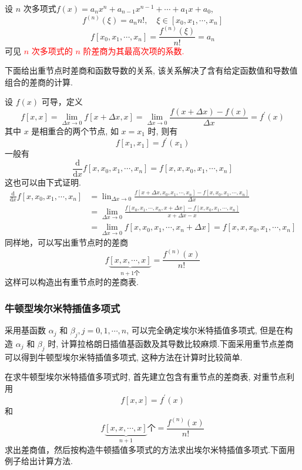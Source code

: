 设 $ n $ 次多项式$f(x)=a_{n} x^{n}+a_{n-1} x^{n-1}+\cdots+a_{1} x+a_{0}$,
$$
f^{(n)}(\xi)=a_{n} n!, \quad \xi \in\left[x_{0}, x_{1}, \cdots, x_{n}\right]$$
$$\boxed{f\left[x_{0}, x_{1}, \cdots, x_{n}\right]=\frac{f^{(n)}(\xi)}{n!}=a_{n}}
$$
可见 \textcolor{red}{$ n $ 次多项式的 $ n $ 阶差商为其最高次项的系数.}

下面给出重节点时差商和函数导数的关系, 该关系解决了含有给定函数值和导数值组合的差商的计算.

设 $ f(x) $ 可导，定义
$$
f[x, x]=\lim _{\Delta x \rightarrow 0} f[x+\Delta x, x]=\lim _{\Delta x \rightarrow 0} \frac{f(x+\Delta x)-f(x)}{\Delta x}=f^{\prime}(x) 
$$
其中 $ x $ 是相重合的两个节点, 如 $ x=x_{1} $ 时, 则有
$$
f\left[x_{1}, x_{1}\right]=f^{\prime}\left(x_{1}\right)
$$
一般有
$$
\frac{\mathrm{d}}{\mathrm{d} x} f\left[x, x_{0}, x_{1}, \cdots, x_{n}\right]=f\left[x, x, x_{0}, x_{1}, \cdots, x_{n}\right]
$$
这也可以由下式证明.
$$
\begin{aligned}
\frac{\mathrm{d}}{\mathrm{d} x} f\left[x, x_{0}, x_{1}, \cdots, x_{n}\right] & =\operatorname{lin}_{\Delta x \rightarrow 0} \frac{f\left[x+\Delta x, x_{0}, x_{1}, \cdots, x_{n}\right]-f\left[x, x_{0}, x_{1}, \cdots, x_{n}\right]}{\Delta x} \\
& =\lim _{\Delta x \rightarrow 0} \frac{f\left[x_{0}, x_{1}, \cdots, x_{n}, x+\Delta x\right]-f\left[x, x_{0}, x_{1}, \cdots, x_{n}\right]}{x+\Delta x-x} \\
& =\lim_{\Delta x \rightarrow 0} f\left[x, x_{0}, x_{1}, \cdots, x_{n}+\Delta x\right]=f\left[x, x, x_{0}, x_{1}, \cdots, x_{n}\right]
\end{aligned}
$$
同样地，可以写出重节点时的差商
$$
f \underbrace{[x, x, \cdots, x]}_{n+1 \text{个}}=\frac{f^{(n)}(x)}{n!}
$$
这样可以构造出有重节点时的差商表.

\subsubsection{牛顿型埃尔米特插值多项式}

采用基函数 $ \alpha_{j} $ 和 $ \beta_{j}, j=0,1, \cdots, n $, 可以完全确定埃尔米特插值多项式, 但是在构造 $ \alpha_{j} $ 和 $ \beta_{j} $ 时, 计算拉格朗日插值基函数及其导数比较麻烦.下面采用重节点差商可以得到牛顿型埃尔米特插值多项式, 这种方法在计算时比较简单.

在求牛顿型埃尔米特插值多项式时, 首先建立包含有重节点的差商表, 对重节点利用
$$
f[x, x]=f^{\prime}(x)
$$
和
$$
f \underbrace{[x, x, \cdots, x]}_{n+1 }\text{个}=\frac{f^{(n)}(x)}{n!}
$$
求出差商值，然后按构造牛顿插值多项式的方法求出埃尔米特插值多项式.下面用例子给出计算方法.

